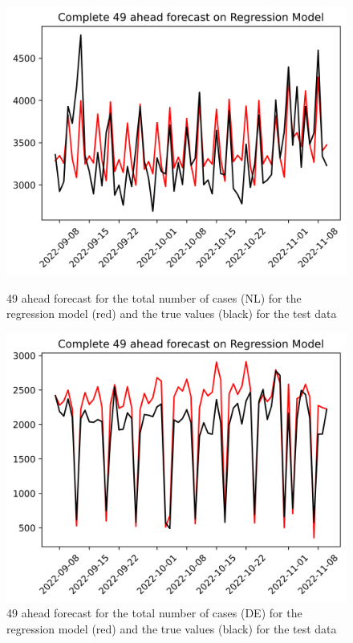 \begin{figure}

\begin{minipage}{.45\textwidth}
  \centering
  \includegraphics[width=\linewidth]{pics/49_ah/Complete_49_ahead_Regression Model.png}
  \caption{49 ahead forecast for the total number of cases (NL) for the regression model (red) and the true values (black) for the test data}
  \label{fig:tot_cases_fc_49_RM}
\end{minipage}
\begin{minipage}{.45\textwidth}
  \centering
  \includegraphics[width=\linewidth]{pics/49_ah/DE_Complete_49_ahead_Regression Model.png}
  \caption{49 ahead forecast for the total number of cases (DE) for the regression model (red) and the true values (black) for the test data}
  \label{fig:tot_cases_fc_49_RM_DE}
\end{minipage}

\end{figure}
